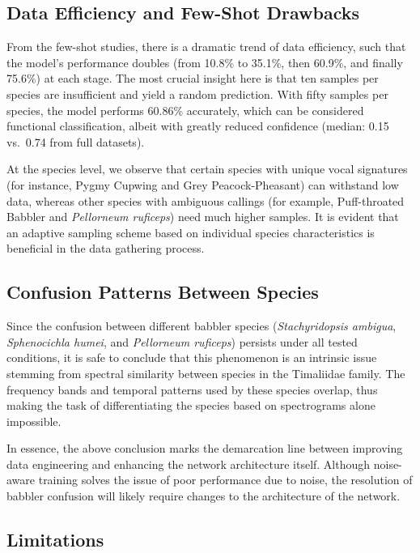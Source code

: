 \documentclass[conference]{IEEEtran}
\begin{document}
\subsection{Data Efficiency and Few-Shot Drawbacks}

From the few-shot studies, there is a dramatic trend of data efficiency, such that the model's performance doubles (from 10.8\% to 35.1\%, then 60.9\%, and finally 75.6\%) at each stage. The most crucial insight here is that ten samples per species are insufficient and yield a random prediction. With fifty samples per species, the model performs 60.86\% accurately, which can be considered functional classification, albeit with greatly reduced confidence (median: 0.15 vs.\ 0.74 from full datasets).

At the species level, we observe that certain species with unique vocal signatures (for instance, Pygmy Cupwing and Grey Peacock-Pheasant) can withstand low data, whereas other species with ambiguous callings (for example, Puff-throated Babbler and \textit{Pellorneum ruficeps}) need much higher samples. It is evident that an adaptive sampling scheme based on individual species characteristics is beneficial in the data gathering process.

\subsection{Confusion Patterns Between Species}

Since the confusion between different babbler species (\textit{Stachyridopsis ambigua}, \textit{Sphenocichla humei}, and \textit{Pellorneum ruficeps}) persists under all tested conditions, it is safe to conclude that this phenomenon is an intrinsic issue stemming from spectral similarity between species in the Timaliidae family. The frequency bands and temporal patterns used by these species overlap, thus making the task of differentiating the species based on spectrograms alone impossible.

In essence, the above conclusion marks the demarcation line between improving data engineering and enhancing the network architecture itself. Although noise-aware training solves the issue of poor performance due to noise, the resolution of babbler confusion will likely require changes to the architecture of the network.

\subsection{Limitations}
\end{document}
